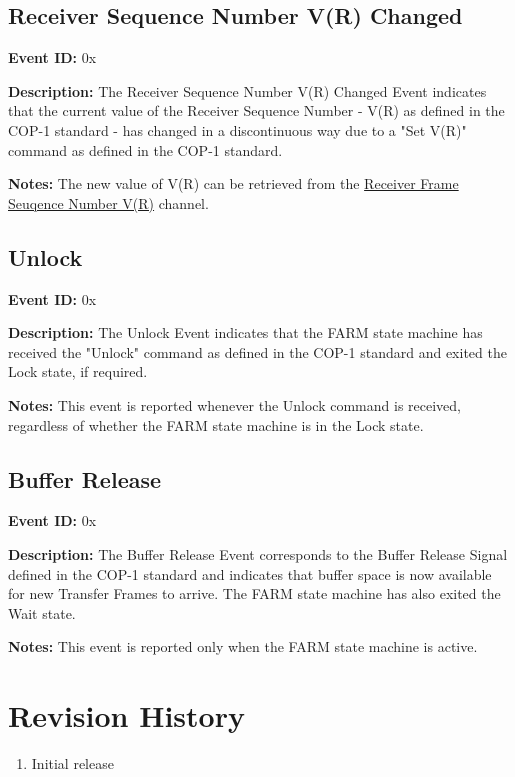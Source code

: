 \documentclass{hitec}
\newcounter{idval}
\newcommand*{\elyid}[0]{0x\padzeroes[2]\Hexadecimal{idval}\addtocounter{idval}{1}}
\let\oldaddcontentsline\addcontentsline
\newcommand{\starttocentries}{\let\addcontentsline\oldaddcontentsline}
\begin{document}
\subsection{Receiver Sequence Number V(R) Changed}
\label{evt:sdlpvr}

\noindent \textbf{Event ID:} \elyid 

\noindent \textbf{Description:} The Receiver Sequence Number V(R) Changed Event
indicates that the current value of the Receiver Sequence Number - V(R) as
defined in the COP-1 standard -  has changed in a discontinuous way due to a
"Set V(R)" command as defined in the COP-1 standard.

\noindent \textbf{Notes:} The new value of V(R) can be retrieved from the
\hyperref[chan:sdlpvr]{Receiver Frame Seuqence Number V(R)} channel.

\subsection{Unlock}
\label{evt:sdlpunlock}

\noindent \textbf{Event ID:} \elyid 

\noindent \textbf{Description:} The Unlock Event indicates that the FARM state
machine has received the "Unlock" command as defined in the COP-1 standard and
exited the Lock state, if required.

\noindent \textbf{Notes:} This event is reported whenever the Unlock command is
received, regardless of whether the FARM state machine is in the Lock state.

\subsection{Buffer Release}
\label{evt:sdlpunwait}

\noindent \textbf{Event ID:} \elyid 

\noindent \textbf{Description:} The Buffer Release Event corresponds to the
Buffer Release Signal defined in the COP-1 standard and indicates that buffer
space is now available for new Transfer Frames to arrive. The FARM state
machine has also exited the Wait state.

\noindent \textbf{Notes:} This event is reported only when the FARM state
machine is active.

\starttocentries

\appendix

\section{Revision History}

\begin{enumerate}
		\item Initial release
\end{enumerate}
\end{document}
